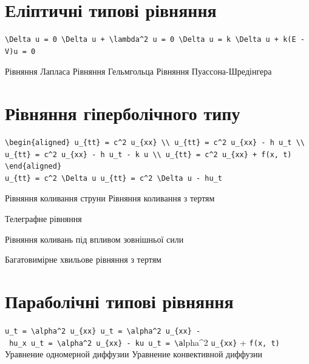 \documentclass[
  ukrainian,
]{article}
\begin{document}
\section{Еліптичні типові
рівняння}\label{ux435ux43bux456ux43fux442ux438ux447ux43dux456-ux442ux438ux43fux43eux432ux456-ux440ux456ux432ux43dux44fux43dux43dux44f}

\begin{verbatim}
\Delta u = 0 \Delta u + \lambda^2 u = 0 \Delta u = k \Delta u + k(E - V)u = 0
\end{verbatim}

Рівняння Лапласа Рівняння Гельмгольца Рівняння Пуассона-Шредінгера

\section{Рівняння гіперболічного
типу}\label{ux440ux456ux432ux43dux44fux43dux43dux44f-ux433ux456ux43fux435ux440ux431ux43eux43bux456ux447ux43dux43eux433ux43e-ux442ux438ux43fux443}

\begin{verbatim}
\begin{aligned} u_{tt} = c^2 u_{xx} \\ u_{tt} = c^2 u_{xx} - h u_t \\ u_{tt} = c^2 u_{xx} - h u_t - k u \\ u_{tt} = c^2 u_{xx} + f(x, t) \end{aligned}
u_{tt} = c^2 \Delta u u_{tt} = c^2 \Delta u - hu_t
\end{verbatim}

Рівняння коливання струни Рівняння коливання з тертям

Телеграфне рівняння

Рівняння коливань під впливом зовнішньої сили

Багатовимірне хвильове рівняння з тертям

\section{Параболічні типові
рівняння}\label{ux43fux430ux440ux430ux431ux43eux43bux456ux447ux43dux456-ux442ux438ux43fux43eux432ux456-ux440ux456ux432ux43dux44fux43dux43dux44f}

\texttt{u\_t\ =\ \textbackslash{}alpha\^{}2\ u\_\{xx\}\ u\_t\ =\ \textbackslash{}alpha\^{}2\ u\_\{xx\}\ -\ hu\_x\ u\_t\ =\ \textbackslash{}alpha\^{}2\ u\_\{xx\}\ -\ ku\ u\_t\ =\ \textbackslash{}a}lpha\^{}2
\texttt{u\_\{xx\}} + \texttt{f(x,\ t)} Уравнение одномерной диффузии
Уравнение конвективной диффузии
\end{document}
